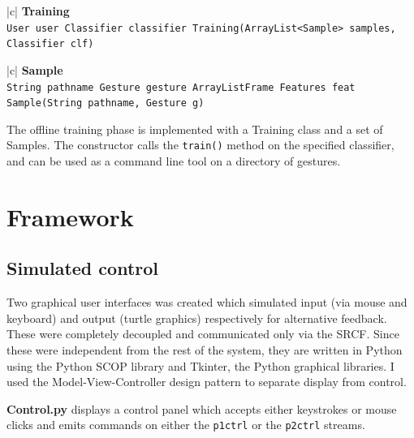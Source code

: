 \documentclass[12pt,a4,notitlepage]{report}
\renewcommand{\_}{\texttt{\symbol{95}}}
\newcommand{\<}{\texttt{\symbol{60}}}
\renewcommand{\>}{\texttt{\symbol{62}}}
\newcommand{\class}[1]{\textbf{#1}}
\newcommand{\scopendpoint}[1]{\texttt{#1}}
\newcommand{\variable}[1]{\texttt{#1}}
\begin{document}
\begin{tabular}{|c|} \hline 
\class{Training} \\ \hline
{}
{\variable{User user \newline
Classifier classifier \newline
Training(ArrayList<Sample> samples, Classifier clf)
} } \\ \hline
\end{tabular}

\begin{tabular}{|c|} \hline 
\class{Sample} \\ \hline
{}
{\variable{String pathname \newline
Gesture gesture \newline
ArrayList\<Frame\> \newline
Features feat \newline
Sample(String pathname, Gesture g)
} } \\ \hline
\end{tabular}

The offline training phase is implemented with a Training class and a set of Samples. The constructor calls the \variable{train()} method on the specified classifier, and can be used as a command line tool on a directory of gestures.

\section{Framework}

\subsection{Simulated control}

Two graphical user interfaces was created which simulated input (via mouse and keyboard) and output (turtle graphics) respectively for alternative feedback. These were completely decoupled and communicated only via the SRCF. Since these were independent from the rest of the system, they are written in Python using the Python SCOP library and Tkinter, the Python graphical libraries. I used the Model-View-Controller design pattern to separate display from control.

\class{Control.py} displays a control panel which accepts either keystrokes or mouse clicks and emits commands on either the \scopendpoint{p1ctrl} or the \scopendpoint{p2ctrl} streams.
\end{document}
